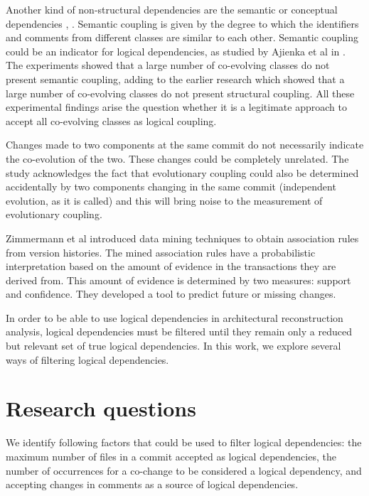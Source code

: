 \documentclass[conference]{IEEEtran}
\begin{document}
Another kind of non-structural dependencies are the semantic or conceptual dependencies \cite{Poshyvanyk2009}, \cite{posh2010}. Semantic coupling is given by the degree to which the identifiers
and comments from different classes are similar to each other. Semantic coupling could be an indicator for logical dependencies, as studied by Ajienka et al in \cite{DBLP:journals/ese/AjienkaCC18}. The experiments showed that a large number of co-evolving classes do not present semantic coupling, adding to the earlier research which showed that a large number of co-evolving classes do not present structural coupling. All these experimental findings arise the question whether it is a legitimate approach to accept all co-evolving classes as logical coupling.


Changes made to two components at the same commit do not necessarily indicate the co-evolution of the two. These changes could be completely unrelated. The study \cite{Yu2007} acknowledges the fact that evolutionary coupling could also be determined accidentally by two components changing in the same commit (independent evolution, as it is called) and this will bring noise to the measurement of evolutionary coupling. 


Zimmermann et al \cite{Zimmermann:2004:MVH:998675.999460} introduced data mining techniques to obtain association
rules from version histories.
The mined association rules  have a probabilistic interpretation based on the amount of
evidence in the transactions they are derived from. This
amount of evidence is determined by two measures: 
support and confidence.  They developed a tool to predict future or
missing changes.




In order to be able to use logical dependencies in architectural reconstruction analysis, logical dependencies must be filtered until they remain only a reduced but relevant set of true logical dependencies. In this work, we explore several ways of filtering logical dependencies. 


\section{Research questions}
\label{sec:question}

We identify following factors that could be used to filter logical dependencies: the maximum number of files in a commit accepted as logical dependencies, the number of occurrences for a co-change to be considered a logical dependency, and accepting changes in comments as a source of logical dependencies. 
\end{document}
